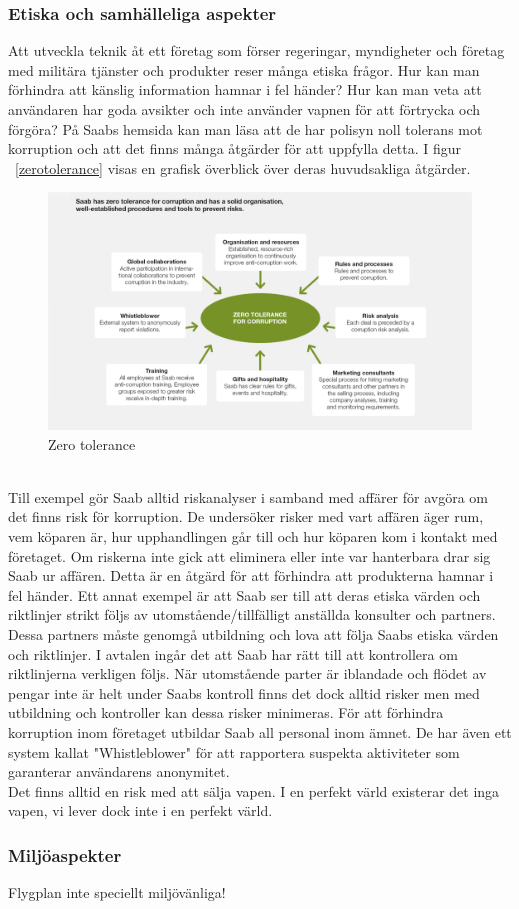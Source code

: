 \subsubsection{Etiska och samhälleliga aspekter}
Att utveckla teknik åt ett företag som förser regeringar, myndigheter och företag med militära tjänster och produkter reser många etiska frågor. Hur kan man förhindra att känslig information hamnar i fel händer? Hur kan man veta att användaren har goda avsikter och inte använder vapnen för att förtrycka och förgöra? På Saabs hemsida kan man läsa att de har polisyn noll tolerans mot korruption och att det finns många åtgärder för att uppfylla detta. I figur ~\ref{zerotolerance} visas en grafisk överblick över deras huvudsakliga åtgärder. 
\\
\leavevmode
\begin{figure}[h]
	\centering
	\includegraphics[scale=1.4]{grafik/modell_zero_corruption_1140x640.png}
	\caption{Zero tolerance}\label{fig:zerotolerance}	
\end{figure}  
\\
Till exempel gör Saab alltid riskanalyser i samband med affärer för avgöra om det finns risk för korruption. De undersöker risker med vart affären äger rum, vem köparen är, hur upphandlingen går till och hur köparen kom i kontakt med företaget. Om riskerna inte gick att eliminera eller inte var hanterbara drar sig Saab ur affären. Detta är en åtgärd för att förhindra att produkterna hamnar i fel händer. Ett annat exempel är att Saab ser till att deras etiska värden och riktlinjer strikt följs av utomstående/tillfälligt anställda konsulter och partners. Dessa partners måste genomgå utbildning och lova att följa Saabs etiska värden och riktlinjer. I avtalen ingår det att Saab har rätt till att kontrollera om riktlinjerna verkligen följs. När utomstående parter är iblandade och flödet av pengar inte är helt under Saabs kontroll finns det dock alltid risker men med utbildning och kontroller kan dessa risker minimeras. För att förhindra korruption inom företaget utbildar Saab all personal inom ämnet. De har även ett system kallat "Whistleblower" för att rapportera suspekta aktiviteter som garanterar användarens anonymitet.                 
\\

Det finns alltid en risk med att sälja vapen. I en perfekt värld existerar det inga vapen, vi lever dock inte i en perfekt värld.


\subsubsection{Miljöaspekter}
Flygplan inte speciellt miljövänliga!